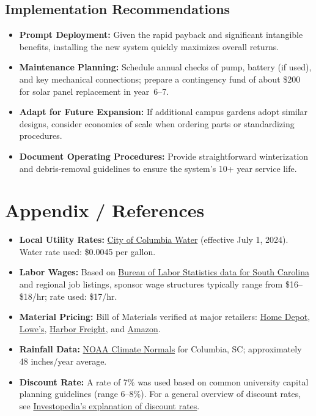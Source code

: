 \documentclass[12pt]{article}
\begin{document}
\subsection*{Implementation Recommendations}
\begin{itemize}
    \item \textbf{Prompt Deployment:} Given the rapid payback and significant intangible benefits, installing the new system quickly maximizes overall returns.
    \item \textbf{Maintenance Planning:} Schedule annual checks of pump, battery (if used), and key mechanical connections; prepare a contingency fund of about \$200 for solar panel replacement in year~6--7.
    \item \textbf{Adapt for Future Expansion:} If additional campus gardens adopt similar designs, consider economies of scale when ordering parts or standardizing procedures.
    \item \textbf{Document Operating Procedures:} Provide straightforward winterization and debris-removal guidelines to ensure the system’s 10+ year service life.
\end{itemize}

\newpage
\section*{Appendix / References}
\begin{itemize}
    \item \textbf{Local Utility Rates:}  
    \href{http://www.columbiascwater.net}{City of Columbia Water} (effective July 1, 2024). Water rate used: \$0.0045 per gallon.
    \item \textbf{Labor Wages:}  
    Based on \href{https://www.bls.gov/oes/current/oes_sc.htm}{Bureau of Labor Statistics data for South Carolina} and regional job listings, sponsor wage structures typically range from \$16--\$18/hr; rate used: \$17/hr.
    \item \textbf{Material Pricing:}  
    Bill of Materials verified at major retailers: 
    \href{https://www.homedepot.com/}{Home Depot}, 
    \href{https://www.lowes.com/}{Lowe’s}, 
    \href{https://www.harborfreight.com/}{Harbor Freight}, and 
    \href{https://www.amazon.com/}{Amazon}.
    \item \textbf{Rainfall Data:}  
    \href{https://www.noaa.gov/}{NOAA Climate Normals} for Columbia, SC; approximately 48 inches/year average.
    \item \textbf{Discount Rate:}  
    A rate of 7\% was used based on common university capital planning guidelines (range 6--8\%). For a general overview of discount rates, see \href{https://www.investopedia.com/terms/d/discountrate.asp}{Investopedia's explanation of discount rates}.
\end{itemize}
\end{document}
